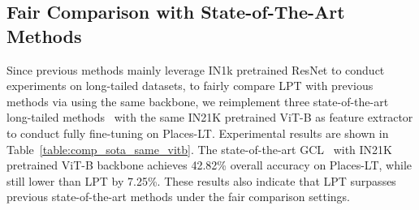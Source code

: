 \documentclass{article} \usepackage{iclr2023_conference,times}
\begin{document}
\begin{table}
\centering
   \caption{Fair comparison with state-of-the-art methods on Places-LT dataset. All methods start from the same IN21K pretrained ViT-B feature extractor to conduct fully fine-tuning or prompt tuning. Quantitative results show that LPT still largely surpasses previous methods by 7.25\%.}
\setlength{\tabcolsep}{13.6pt} \renewcommand{\arraystretch}{3.5}{ \fontsize{8.3}{3}}
   \label{table:comp_sota_same_vitb}
\end{table}

\subsection{Fair Comparison with State-of-The-Art Methods}\label{sec:fair_comp_sota}
Since previous methods mainly leverage IN1k pretrained ResNet to conduct experiments on long-tailed datasets, 
to fairly compare LPT with previous methods via using the same backbone, we reimplement three state-of-the-art long-tailed methods~\citep{Kang2020Decoupling,cui2021parametric,Li2022Long} with the same IN21K pretrained ViT-B as feature extractor to conduct fully fine-tuning on Places-LT. Experimental results are shown in Table~\ref{table:comp_sota_same_vitb}. The state-of-the-art GCL~\citep{Li2022Long} with IN21K pretrained ViT-B backbone achieves 42.82\% overall accuracy on Places-LT, while still lower than LPT by 7.25\%. These results also indicate that LPT surpasses previous state-of-the-art methods under the fair comparison settings.
\end{document}
